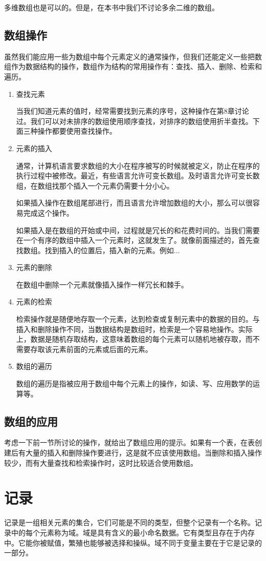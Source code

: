 多维数组也是可以的。但是，在本书中我们不讨论多余二维的数组。
\subsection{数组操作}
虽然我们能应用一些为数组中每个元素定义的通常操作，但我们还能定义一些把数组作为数据结构的操作，数组作为结构的常用操作有：查找、插入、删除、检索和遍历。
\begin{enumerate}
	\item 查找元素

	当我们知道元素的值时，经常需要找到元素的序号，这种操作在第8章讨论过。我们可以对未排序的数组使用顺序查找，对排序的数组使用折半查找。下面三种操作都要使用查找操作。
	\item 元素的插入

	通常，计算机语言要求数组的大小在程序被写的时候就被定义，防止在程序的执行过程中被修改。最近，有些语言允许可变长数组。及时语言允许可变长数组，在数组找那个插入一个元素仍需要十分小心。

如果插入操作在数组尾部进行，而且语言允许增加数组的大小，那么可以很容易完成这个操作。

如果插入是在数组的开始或中间，过程就是冗长的和花费时间的。当我们需要在一个有序的数组中插入一个元素时，这就发生了。就像前面描述的，首先查找数组。找到插入的位置后，插入新的元素。例如...
	\item 元素的删除

	在数组中删除一个元素就像插入操作一样冗长和棘手。
	\item 元素的检索

	检索操作就是随便地存取一个元素，达到检查或复制元素中的数据的目的。与插入和删除操作不同，当数据结构是数组时，检索是一个容易地操作。实际上，数据是随机存取结构，这意味着数组的每个元素可以随机地被存取，而不需要存取该元素前面的元素或后面的元素。
	\item 数组的遍历

	数组的遍历是指被应用于数组中每个元素上的操作，如读、写、应用数学的运算等。
\end{enumerate}
\subsection{数组的应用}
考虑一下前一节所讨论的操作，就给出了数组应用的提示。如果有一个表，在表创建后有大量的插入和删除操作要进行，这是就不应该使用数组。当删除和插入操作较少，而有大量查找和检索操作时，这时比较适合使用数组。
\section{记录}
记录是一组相关元素的集合，它们可能是不同的类型，但整个记录有一个名称。记录中的每个元素称为域。域是具有含义的最小命名数据。它有类型且存在于内存中。它能你被赋值，繁殖也能够被选择和操纵。域不同于变量主要在于它是记录的一部分。

